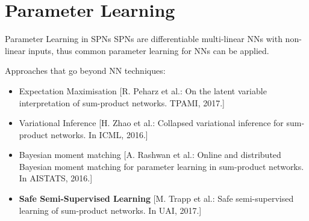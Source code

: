\section{Parameter Learning}

\begin{frame}{Parameter Learning in SPNs}{}
SPNs are differentiable multi-linear NNs with non-linear inputs, thus common parameter learning for NNs can be applied.

Approaches that go beyond NN techniques:
\begin{itemize}
    \item Expectation Maximisation {\scriptsize [R. Peharz et al.: On the latent variable interpretation of sum-product networks. TPAMI, 2017.]}
    \item Variational Inference {\scriptsize [H. Zhao et al.: Collapsed variational inference for sum-product networks. In ICML, 2016.]}
    \item Bayesian moment matching {\scriptsize [A. Rashwan et al.: Online and distributed Bayesian moment matching for parameter learning in sum-product networks. In AISTATS, 2016.]}
    \item \textbf{Safe Semi-Supervised Learning} {\scriptsize [M. Trapp et al.: Safe semi-supervised learning of sum-product networks. In UAI, 2017.]}
\end{itemize}

\end{frame}


